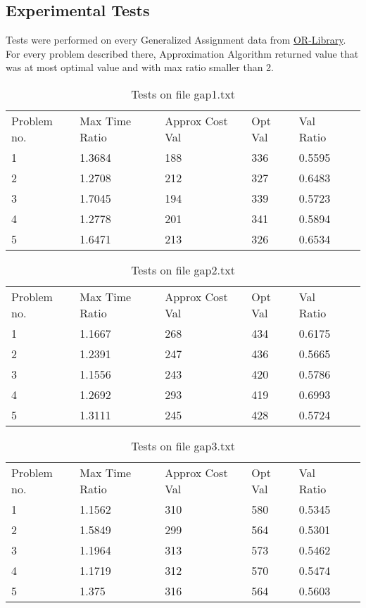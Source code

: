 \subsection{Experimental Tests}
Tests were performed on every Generalized Assignment data from \href{https://people.brunel.ac.uk/~mastjjb/jeb/info.html}{OR-Library}. 
For every problem described there, Approximation Algorithm returned value that was at most optimal value and with max ratio smaller than 2. 


\begin{table}[]
    \caption{Tests on file gap1.txt}
    \centering
    \begin{tabular}{llllll}
    Problem no. & Max Time Ratio & Approx Cost Val  & Opt Val & Val Ratio \\ 1 & 1.3684 & 188 & 336 & 0.5595\\ \hline
2 & 1.2708 & 212 & 327 & 0.6483\\ \hline
3 & 1.7045 & 194 & 339 & 0.5723\\ \hline
4 & 1.2778 & 201 & 341 & 0.5894\\ \hline
5 & 1.6471 & 213 & 326 & 0.6534\\ \hline
\end{tabular}
    \end{table}
    

    \begin{table}[]
    \caption{Tests on file gap2.txt}
    \centering
    \begin{tabular}{llllll}
    Problem no. & Max Time Ratio & Approx Cost Val  & Opt Val & Val Ratio \\ 1 & 1.1667 & 268 & 434 & 0.6175\\ \hline
2 & 1.2391 & 247 & 436 & 0.5665\\ \hline
3 & 1.1556 & 243 & 420 & 0.5786\\ \hline
4 & 1.2692 & 293 & 419 & 0.6993\\ \hline
5 & 1.3111 & 245 & 428 & 0.5724\\ \hline
\end{tabular}
    \end{table}
    

    \begin{table}[]
    \caption{Tests on file gap3.txt}
    \centering
    \begin{tabular}{llllll}
    Problem no. & Max Time Ratio & Approx Cost Val  & Opt Val & Val Ratio \\ 1 & 1.1562 & 310 & 580 & 0.5345\\ \hline
2 & 1.5849 & 299 & 564 & 0.5301\\ \hline
3 & 1.1964 & 313 & 573 & 0.5462\\ \hline
4 & 1.1719 & 312 & 570 & 0.5474\\ \hline
5 & 1.375 & 316 & 564 & 0.5603\\ \hline
\end{tabular}
    \end{table}
    

